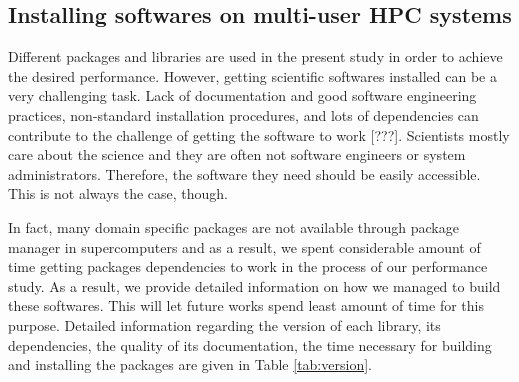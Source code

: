 \subsection{Installing softwares on multi-user HPC systems}

Different packages and libraries are used in the present study in order to achieve the desired performance. 
However, getting scientific softwares installed can be a very challenging task.
Lack of documentation and good software engineering practices, non-standard installation procedures, and lots of dependencies can contribute to the challenge of getting the software to work [???].
Scientists mostly care about the science and they are often not software engineers or system administrators. 
Therefore, the software they need should be easily accessible. 
This is not always the case, though.

In fact, many domain specific packages are not available through package manager in supercomputers and as a result,
we spent considerable amount of time getting packages dependencies to work in the process of our performance study. 
As a result, we provide detailed information on how we managed to build these softwares.
This will let future works spend least amount of time for this purpose. 
Detailed information regarding the version of each library, its dependencies, the quality of its documentation, the time necessary for building and installing the packages are given in Table \ref{tab:version}. 

